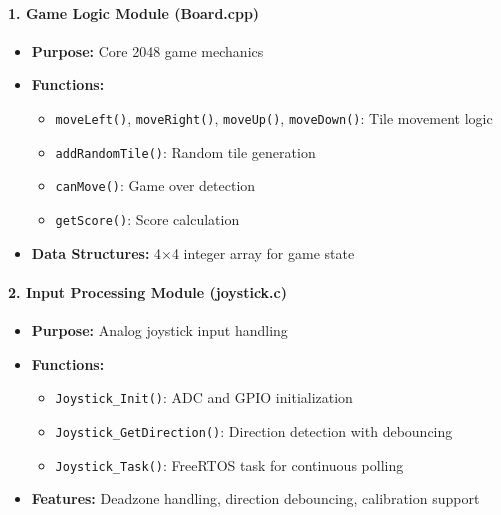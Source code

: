 \documentclass[12pt,a4paper]{article}
\begin{document}
\paragraph{1. Game Logic Module (Board.cpp)}
\begin{itemize}[leftmargin=*]
    \item \textbf{Purpose:} Core 2048 game mechanics
    \item \textbf{Functions:}
    \begin{itemize}
        \item \texttt{moveLeft()}, \texttt{moveRight()}, \texttt{moveUp()}, \texttt{moveDown()}: Tile movement logic
        \item \texttt{addRandomTile()}: Random tile generation
        \item \texttt{canMove()}: Game over detection
        \item \texttt{getScore()}: Score calculation
    \end{itemize}
    \item \textbf{Data Structures:} 4×4 integer array for game state
\end{itemize}

\paragraph{2. Input Processing Module (joystick.c)}
\begin{itemize}[leftmargin=*]
    \item \textbf{Purpose:} Analog joystick input handling
    \item \textbf{Functions:}
    \begin{itemize}
        \item \texttt{Joystick\_Init()}: ADC and GPIO initialization
        \item \texttt{Joystick\_GetDirection()}: Direction detection with debouncing
        \item \texttt{Joystick\_Task()}: FreeRTOS task for continuous polling
    \end{itemize}
    \item \textbf{Features:} Deadzone handling, direction debouncing, calibration support
\end{itemize}
\end{document}
